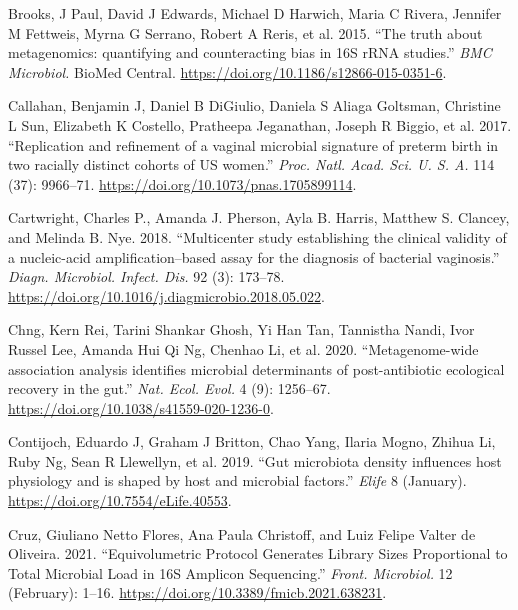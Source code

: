 \documentclass[
]{article}
\newlength{\cslhangindent}
\newlength{\cslentryspacingunit} %
\newenvironment{CSLReferences}[2] %
 {%
  \setlength{\parindent}{0pt}
  \ifodd #1
  \let\oldpar\par
  \def\par{\hangindent=\cslhangindent\oldpar}
  \fi
  \setlength{\parskip}{#2\cslentryspacingunit}
 }%
 {}
\begin{document}
\hypertarget{refs}{}
\begin{CSLReferences}{1}{0}
\leavevmode{}%
Brooks, J Paul, David J Edwards, Michael D Harwich, Maria C Rivera, Jennifer M Fettweis, Myrna G Serrano, Robert A Reris, et al. 2015. {``{The truth about metagenomics: quantifying and counteracting bias in 16S rRNA studies}.''} \emph{BMC Microbiol.} BioMed Central. \url{https://doi.org/10.1186/s12866-015-0351-6}.

\leavevmode{}%
Callahan, Benjamin J, Daniel B DiGiulio, Daniela S Aliaga Goltsman, Christine L Sun, Elizabeth K Costello, Pratheepa Jeganathan, Joseph R Biggio, et al. 2017. {``{Replication and refinement of a vaginal microbial signature of preterm birth in two racially distinct cohorts of US women}.''} \emph{Proc. Natl. Acad. Sci. U. S. A.} 114 (37): 9966--71. \url{https://doi.org/10.1073/pnas.1705899114}.

\leavevmode{}%
Cartwright, Charles P., Amanda J. Pherson, Ayla B. Harris, Matthew S. Clancey, and Melinda B. Nye. 2018. {``{Multicenter study establishing the clinical validity of a nucleic-acid amplification--based assay for the diagnosis of bacterial vaginosis}.''} \emph{Diagn. Microbiol. Infect. Dis.} 92 (3): 173--78. \url{https://doi.org/10.1016/j.diagmicrobio.2018.05.022}.

\leavevmode{}%
Chng, Kern Rei, Tarini Shankar Ghosh, Yi Han Tan, Tannistha Nandi, Ivor Russel Lee, Amanda Hui Qi Ng, Chenhao Li, et al. 2020. {``{Metagenome-wide association analysis identifies microbial determinants of post-antibiotic ecological recovery in the gut}.''} \emph{Nat. Ecol. Evol.} 4 (9): 1256--67. \url{https://doi.org/10.1038/s41559-020-1236-0}.

\leavevmode{}%
Contijoch, Eduardo J, Graham J Britton, Chao Yang, Ilaria Mogno, Zhihua Li, Ruby Ng, Sean R Llewellyn, et al. 2019. {``{Gut microbiota density influences host physiology and is shaped by host and microbial factors}.''} \emph{Elife} 8 (January). \url{https://doi.org/10.7554/eLife.40553}.

\leavevmode{}%
Cruz, Giuliano Netto Flores, Ana Paula Christoff, and Luiz Felipe Valter de Oliveira. 2021. {``{Equivolumetric Protocol Generates Library Sizes Proportional to Total Microbial Load in 16S Amplicon Sequencing}.''} \emph{Front. Microbiol.} 12 (February): 1--16. \url{https://doi.org/10.3389/fmicb.2021.638231}.


\end{CSLReferences}
\end{document}
